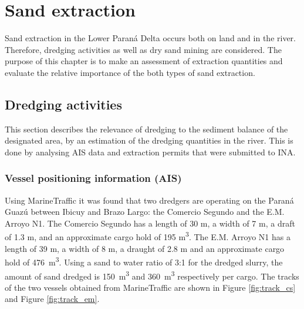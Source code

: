 \chapter{Sand extraction}
Sand extraction in the Lower Paraná Delta occurs both on land and in the river. Therefore, dredging activities as well as dry sand mining are considered. The purpose of this chapter is to make an assessment of extraction quantities and evaluate the relative importance of the both types of sand extraction. 

\section{Dredging activities}
\label{sec: Dredging activities}
This section describes the relevance of dredging to the sediment balance of the designated area, by an estimation of the dredging quantities in the river. This is done by analysing AIS data and extraction permits that were submitted to INA.

\subsection{Vessel positioning information (AIS)}
Using MarineTraffic it was found that two dredgers are operating on the Paraná Guazú between Ibicuy and Brazo Largo: the Comercio Segundo and the E.M. Arroyo N1. The Comercio Segundo has a length of 30 m, a width of 7 m, a draft of 1.3 m, and an approximate cargo hold of 195 m\textsuperscript{3}. The E.M. Arroyo N1 has a length of 39 m, a width of 8 m, a draught of 2.8 m and an approximate cargo hold of 476 \,m\textsuperscript{3}. Using a sand to water ratio of 3:1 for the dredged slurry, the amount of sand dredged is 150 \,m\textsuperscript{3} and 360 \,m\textsuperscript{3} respectively per cargo. The tracks of the two vessels obtained from MarineTraffic are shown in Figure \ref{fig:track_cs} and Figure \ref{fig:track_em}.

